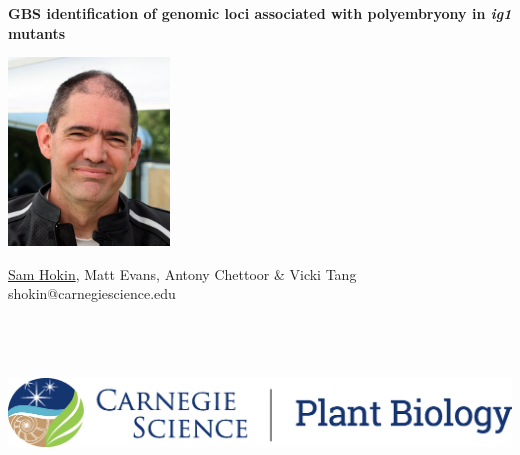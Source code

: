 \documentclass[a0,portrait]{a0poster}
\begin{document}


\textbf{\color{CarnegiePriBlue} \Huge GBS identification of genomic loci associated with polyembryony in \textit{ig1} mutants}    %

\begin{minipage}[m]{0.06\linewidth}
  \includegraphics[height=50mm]{sam-bfr-smiling-crop.jpg} %
  \hfill
\end{minipage}
\begin{minipage}[m]{0.46\linewidth}                      %
  \raggedright
  \color{Black}
  \Large \underline{Sam Hokin}, Matt Evans, Antony Chettoor \& Vicki Tang \\
  \vspace{5mm} 
  \large shokin@carnegiescience.edu
\end{minipage}
\hfill
\begin{minipage}[m]{0.48\linewidth}                      %
  \hfill
  \includegraphics[height=50mm]{CS_plantbio_logo_horz.eps} 
\end{minipage}
\end{document}
